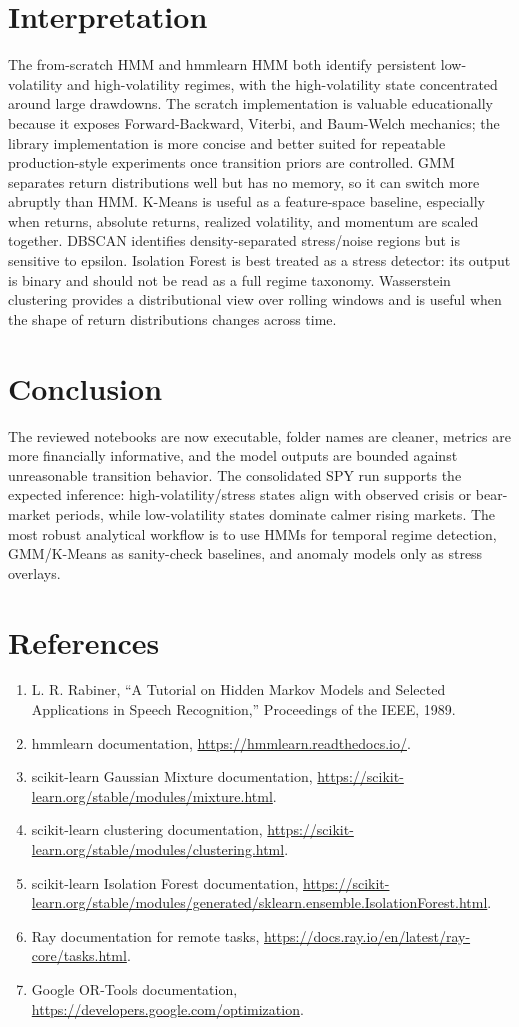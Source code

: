\documentclass[12pt,a4paper]{article}
\begin{document}
\section{Interpretation}
The from-scratch HMM and hmmlearn HMM both identify persistent low-volatility and high-volatility regimes, with the high-volatility state concentrated around large drawdowns. The scratch implementation is valuable educationally because it exposes Forward-Backward, Viterbi, and Baum-Welch mechanics; the library implementation is more concise and better suited for repeatable production-style experiments once transition priors are controlled. GMM separates return distributions well but has no memory, so it can switch more abruptly than HMM. K-Means is useful as a feature-space baseline, especially when returns, absolute returns, realized volatility, and momentum are scaled together. DBSCAN identifies density-separated stress/noise regions but is sensitive to epsilon. Isolation Forest is best treated as a stress detector: its output is binary and should not be read as a full regime taxonomy. Wasserstein clustering provides a distributional view over rolling windows and is useful when the shape of return distributions changes across time.

\section{Conclusion}
The reviewed notebooks are now executable, folder names are cleaner, metrics are more financially informative, and the model outputs are bounded against unreasonable transition behavior. The consolidated SPY run supports the expected inference: high-volatility/stress states align with observed crisis or bear-market periods, while low-volatility states dominate calmer rising markets. The most robust analytical workflow is to use HMMs for temporal regime detection, GMM/K-Means as sanity-check baselines, and anomaly models only as stress overlays.

\section{References}
\begin{enumerate}
\item L. R. Rabiner, ``A Tutorial on Hidden Markov Models and Selected Applications in Speech Recognition,'' Proceedings of the IEEE, 1989.
\item hmmlearn documentation, \url{https://hmmlearn.readthedocs.io/}.
\item scikit-learn Gaussian Mixture documentation, \url{https://scikit-learn.org/stable/modules/mixture.html}.
\item scikit-learn clustering documentation, \url{https://scikit-learn.org/stable/modules/clustering.html}.
\item scikit-learn Isolation Forest documentation, \url{https://scikit-learn.org/stable/modules/generated/sklearn.ensemble.IsolationForest.html}.
\item Ray documentation for remote tasks, \url{https://docs.ray.io/en/latest/ray-core/tasks.html}.
\item Google OR-Tools documentation, \url{https://developers.google.com/optimization}.
\end{enumerate}
\end{document}
